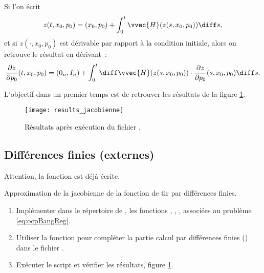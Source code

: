 \begin{myremark}
    Si l'on \'ecrit 
    \[
        z(t, x_0, p_0) = (x_0, p_0) + \int_0^t \vvec{H}(z(s,x_0,p_0)) \diff s,
        \]
    et si $z(\cdot, x_0, p_0)$ est d\'erivable par rapport \`a la condition initiale, alors on retrouve le r\'esultat en d\'erivant~:
    \[
        \frac{\partial z}{\partial p_0}(t,x_0,p_0) = (0_n, I_n) +
        \int_0^t \diff \vvec{H}(z(s,x_0,p_0)) \cdot \frac{\partial z}{\partial p_0}(s,x_0,p_0) \diff s.
    \]
\end{myremark}

L'objectif dans un premier temps est de retrouver les r\'esultats de la figure \ref{fig:results_jacobienne}.
\begin{figure}[ht!]
    \begin{center}
        \texttt{[image: results\_jacobienne]}
    \end{center}
    \vspace{-3em}
    \caption{R\'esultats apr\`es ex\'ecution du fichier .}
    \label{fig:results_jacobienne}
\end{figure}

\subsection{Diff\'erences finies (externes)}

\begin{myremark}
    Attention, la fonction  est d\'ej\`a \'ecrite.
\end{myremark}

\begin{myExercice} Approximation de la jacobienne de la fonction de tir par diff\'erences finies.
    \begin{enumerate}
        \item Impl\'ementer dans le r\'epertoire  de , les fonctions , ,
            , 
                associ\'ees au probl\`eme \eqref{eq:ocpBangReg}.
        \item Utiliser la fonction  pour compl\'eter la partie calcul par diff\'erences finies ()
            dans le fichier .
        \item Ex\'ecuter le script  et v\'erifier les r\'esultats, \cf figure \ref{fig:results_jacobienne}.
    \end{enumerate}
\end{myExercice}

